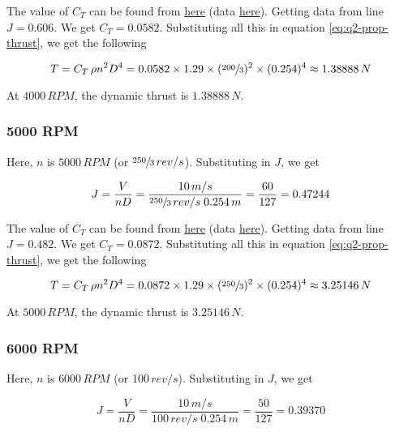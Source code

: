 The value of $C_T$ can be found from \href{https://m-selig.ae.illinois.edu/props/volume-1/plots/apcsf_10x7_ct.png}{here} (data \href{https://m-selig.ae.illinois.edu/props/volume-1/data/apcsf_10x7_kt0830_3999.txt}{here}). Getting data from line $J = 0.606$. We get $C_T = 0.0582$. Substituting all this in equation \ref{eq:q2-prop-thrust}, we get the following

\begin{equation*}
    T = C_T \, \rho n^2 D^4 = 0.0582 \times 1.29 \times (\sfrac{200}{3})^2 \times (0.254)^4 \approx 1.38888\,N
\end{equation*}

At $4000\,RPM$, the dynamic thrust is $1.38888\,N$.

\subsubsection*{5000 RPM}

Here, $n$ is $5000\,RPM$ (or $\sfrac{250}{3}\,rev/s$). Substituting in $J$, we get

\begin{equation*}
    J = \frac{V}{nD} = \frac{10\,m/s}{\sfrac{250}{3}\,rev/s \; 0.254\,m} = \frac{60}{127} = 0.47244
\end{equation*}

The value of $C_T$ can be found from \href{https://m-selig.ae.illinois.edu/props/volume-1/plots/apcsf_10x7_ct.png}{here} (data \href{https://m-selig.ae.illinois.edu/props/volume-1/data/apcsf_10x7_kt0831_5003.txt}{here}). Getting data from line $J = 0.482$. We get $C_T = 0.0872$. Substituting all this in equation \ref{eq:q2-prop-thrust}, we get the following

\begin{equation*}
    T = C_T \, \rho n^2 D^4 = 0.0872 \times 1.29 \times (\sfrac{250}{3})^2 \times (0.254)^4 \approx 3.25146\,N
\end{equation*}

At $5000\,RPM$, the dynamic thrust is $3.25146\,N$.

\subsubsection*{6000 RPM}

Here, $n$ is $6000\,RPM$ (or $100\,rev/s$). Substituting in $J$, we get

\begin{equation*}
    J = \frac{V}{nD} = \frac{10\,m/s}{100\,rev/s \; 0.254\,m} = \frac{50}{127} = 0.39370
\end{equation*}


